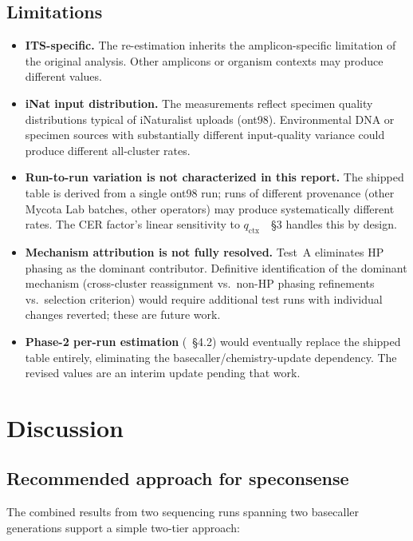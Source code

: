\documentclass[11pt]{article}
\begin{document}
\subsection{Limitations}

\begin{itemize}
\item \textbf{ITS-specific.} The re-estimation inherits the amplicon-specific
limitation of the original analysis. Other amplicons or organism contexts
may produce different values.
\item \textbf{iNat input distribution.} The measurements reflect specimen
quality distributions typical of iNaturalist uploads (ont98). Environmental
DNA or specimen sources with substantially different input-quality variance
could produce different all-cluster rates.
\item \textbf{Run-to-run variation is not characterized in this report.}
The shipped table is derived from a single ont98 run; runs of different
provenance (other Mycota Lab batches, other operators) may produce
systematically different rates. The CER factor's linear sensitivity to
$q_\text{ctx}$~\cite{cer_practice}~\S3 handles this by design.
\item \textbf{Mechanism attribution is not fully resolved.} Test~A
eliminates HP phasing as the dominant contributor. Definitive identification
of the dominant mechanism (cross-cluster reassignment vs.\ non-HP phasing
refinements vs.\ selection criterion) would require additional test runs
with individual changes reverted; these are future work.
\item \textbf{Phase-2 per-run estimation} (\cite{cer_practice}~\S4.2) would
eventually replace the shipped table entirely, eliminating the
basecaller/chemistry-update dependency. The revised values are an interim
update pending that work.
\end{itemize}

\section{Discussion}

\subsection{Recommended approach for speconsense}

The combined results from two sequencing runs spanning two basecaller
generations support a simple two-tier approach:
\end{document}
